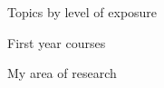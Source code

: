 \documentclass{beamer}\usepackage[]{graphicx}\usepackage[]{color}
\begin{document}
\begin{frame}{Topics by level of exposure}
\end{frame}

\begin{frame}{First year courses}
\end{frame}


\begin{frame}{My area of research}
\end{frame}
\end{document}
